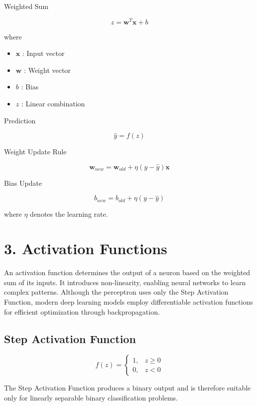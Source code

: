 \documentclass{article}
\begin{document}
Weighted Sum

\[
z=\mathbf{w}^{T}\mathbf{x}+b
\]

where

\begin{itemize}
\item $\mathbf{x}$ : Input vector
\item $\mathbf{w}$ : Weight vector
\item $b$ : Bias
\item $z$ : Linear combination
\end{itemize}

Prediction

\[
\hat y=f(z)
\]

Weight Update Rule

\[
\mathbf{w}_{new}
=
\mathbf{w}_{old}
+
\eta
(y-\hat y)
\mathbf{x}
\]

Bias Update

\[
b_{new}
=
b_{old}
+
\eta
(y-\hat y)
\]

where $\eta$ denotes the learning rate.



\section*{3. Activation Functions}

An activation function determines the output of a neuron based on the weighted sum of its inputs. It introduces non-linearity, enabling neural networks to learn complex patterns. Although the perceptron uses only the Step Activation Function, modern deep learning models employ differentiable activation functions for efficient optimization through backpropagation.

\subsection*{Step Activation Function}

\[
f(z)=
\begin{cases}
1,&z\ge0\\
0,&z<0
\end{cases}
\]

The Step Activation Function produces a binary output and is therefore suitable only for linearly separable binary classification problems.
\end{document}

